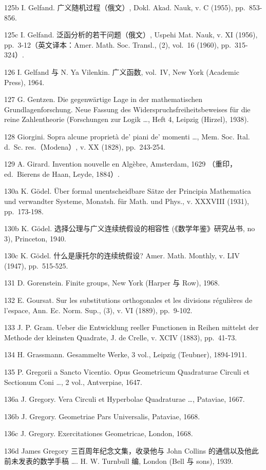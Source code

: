 125b I. Gelfand. 广义随机过程（俄文）, Dokl. Akad. Nauk, v. C (1955), pp.~853-856.

125c I. Gelfand. 泛函分析的若干问题（俄文）, Uspehi Mat. Nauk, v. XI (1956), pp.~3-12（英文译本：Amer. Math. Soc. Transl., (2), vol.~16 (1960), pp.~315-324）.

126 I. Gelfand 与 N. Ya Vilenkin. 广义函数, vol.~IV, New York (Academic Press), 1964.

127 G. Gentzen. Die gegenwärtige Lage in der mathematischen Grundlagenforschung. Neue Fassung des Widerspruchsfreiheitsbeweises für die reine Zahlentheorie (Forschungen zur Logik \ldots, Heft 4, Leipzig (Hirzel), 1938).

128 Giorgini. Sopra alcune proprietà de' piani de' momenti \ldots, Mem. Soc. Ital. d.~Sc. res.（Modena）, v. XX (1828), pp.~243-254.

129 A. Girard. Invention nouvelle en Algèbre, Amsterdam, 1629 （重印，ed.~Bierens de Haan, Leyde, 1884）.

130a K. Gödel. Über formal unentscheidbare Sätze der Principia Mathematica und verwandter Systeme, Monatsh. für Math. und Phys., v. XXXVIII (1931), pp.~173-198.

130b K. Gödel. 选择公理与广义连续统假设的相容性 (《数学年鉴》研究丛书, no 3), Princeton, 1940.

130c K. Gödel. 什么是康托尔的连续统假设? Amer. Math. Monthly, v. LIV (1947), pp.~515-525.

131 D. Gorenstein. Finite groups, New York (Harper 与 Row), 1968.

132 E. Goursat. Sur les substitutions orthogonales et les divisions régulières de l'espace, Ann. Ec. Norm. Sup., (3), v. VI (1889), pp.~9-102.

133 J. P. Gram. Ueber die Entwicklung reeller Functionen in Reihen mittelst der Methode der kleinsten Quadrate, J. de Crelle, v. XCIV (1883), pp.~41-73.

134 H. Grassmann. Gesammelte Werke, 3 vol., Leipzig (Teubner), 1894-1911.

135 P. Gregorii a Sancto Vicentio. Opus Geometricum Quadraturae Circuli et Sectionum Coni \ldots, 2 vol., Antverpiae, 1647.

136a J. Gregory. Vera Circuli et Hyperbolae Quadraturae \ldots, Pataviae, 1667.

136b J. Gregory. Geometriae Pars Universalis, Pataviae, 1668.

136c J. Gregory. Exercitationes Geometricae, London, 1668.

136d James Gregory 三百周年纪念文集，收录他与 John Collins 的通信以及他此前未发表的数学手稿 \ldots. H. W. Turnbull 编, London (Bell 与 sons), 1939.

